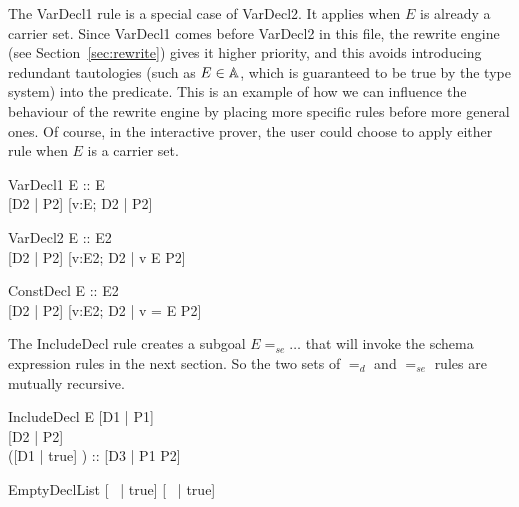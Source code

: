 \documentclass{entcs}
\newcommand{\sexprUnfoldsTo}{\mathrel{=_{se}}}
\newcommand{\declListUnfoldsTo}{\mathrel{=_d}}
\begin{document}
The VarDecl1 rule is a special case of VarDecl2.  It applies when $E$ is
already a carrier set.  Since VarDecl1 comes before VarDecl2 in this file,
the rewrite engine (see Section~\ref{sec:rewrite}) gives it higher
priority, and this avoids introducing redundant tautologies (such as $E \in
{\mathbb A}$, which is guaranteed to be true by the type system) into the
predicate.  This is an example of how we can influence the behaviour of the
rewrite engine by placing more specific rules before more general ones.  Of
course, in the interactive prover, the user could choose to apply either
rule when $E$ is a carrier set.

\begin{zedrule}{VarDecl1}
   \proviso E :: \power E \\
   [D1 | true] \declListUnfoldsTo [D2 | P2]
\derives
   [v:E; D1 | true] \declListUnfoldsTo [v:E; D2 |  P2]
\end{zedrule}

\begin{zedrule}{VarDecl2}
   \proviso E :: \power E2 \\
   [D1 | true] \declListUnfoldsTo [D2 | P2]
\derives
   [v:E; D1 | true] \declListUnfoldsTo [v:E2; D2 |  v \in E \land P2]
\end{zedrule}

\begin{zedrule}{ConstDecl}
   \proviso E :: E2 \\
   [D1 | true] \declListUnfoldsTo [D2 | P2]
\derives
   [v==E; D1 | true] \declListUnfoldsTo [v:E2; D2 |  v = E \land P2]
\end{zedrule}

The IncludeDecl rule creates a subgoal $E \sexprUnfoldsTo \ldots$ that
will invoke the schema expression rules in the next section.  So the
two sets of $\declListUnfoldsTo$ and $\sexprUnfoldsTo$ rules are
mutually recursive.

\begin{zedrule}{IncludeDecl}
   E \sexprUnfoldsTo [D1 | P1] \\
   [D | true] \declListUnfoldsTo [D2 | P2] \\
   \proviso ([D1 | true] \land [D2 | true]) :: \power [D3 | true] 
\derives
   [E; D | true] \declListUnfoldsTo [D3 |  P1 \land P2]
\end{zedrule}

\begin{zedrule}{EmptyDeclList}
   [~ | true] \declListUnfoldsTo [~ | true]
\end{zedrule}
\end{document}
